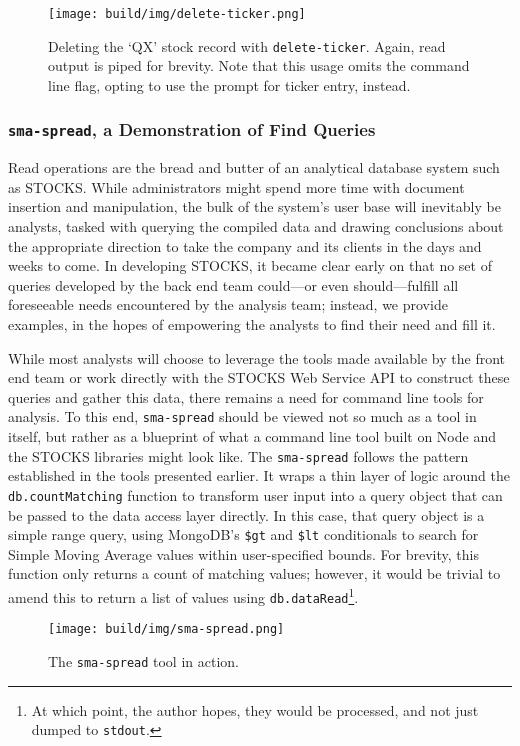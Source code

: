 \documentclass[
11pt,
titlepage,
]{article}
\begin{document}
\begin{figure}[tbp]
  \texttt{[image: build/img/delete-ticker.png]}
  \caption{Deleting the `QX' stock record with \texttt{delete-ticker}. Again,
    read output is piped for brevity. Note that this usage omits the command
    line flag, opting to use the prompt for ticker entry, instead.}
  \label{fig:delete-ticker}
\end{figure}

\subsubsection{\texttt{sma-spread}, a Demonstration of Find Queries}

Read operations are the bread and butter of an analytical database system such
as STOCKS. While administrators might spend more time with document insertion
and manipulation, the bulk of the system's user base will inevitably be
analysts, tasked with querying the compiled data and drawing conclusions about
the appropriate direction to take the company and its clients in the days and
weeks to come. In developing STOCKS, it became clear early on that no set of
queries developed by the back end team could---or even should---fulfill all
foreseeable needs encountered by the analysis team; instead, we provide
examples, in the hopes of empowering the analysts to find their need and fill it.

While most analysts will choose to leverage the tools made available by the
front end team or work directly with the STOCKS Web Service API to construct
these queries and gather this data, there remains a need for command line tools
for analysis. To this end, \texttt{sma-spread} should be viewed not so much as a
tool in itself, but rather as a blueprint of what a command line tool built on
Node and the STOCKS libraries might look like. The \texttt{sma-spread} follows
the pattern established in the tools presented earlier. It wraps a thin layer of
logic around the \texttt{db.countMatching} function to transform user input into
a query object that can be passed to the data access layer directly. In this
case, that query object is a simple range query, using MongoDB's \texttt{\$gt}
and \texttt{\$lt} conditionals to search for Simple Moving Average values within
user-specified bounds. For brevity, this function only returns a count of
matching values; however, it would be trivial to amend this to return a list of
values using \texttt{db.dataRead}\footnote{At which point, the author hopes,
they would be processed, and not just dumped to \texttt{stdout}.}.

\begin{figure}[bp]
  \texttt{[image: build/img/sma-spread.png]}
  \caption{The \texttt{sma-spread} tool in action.}
  \label{fig:sma-spread}
\end{figure}

\end{document}
